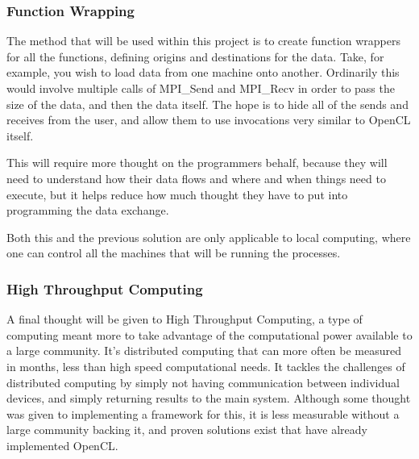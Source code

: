 \documentclass[../thesis.tex]{subfiles}
\begin{document}
        \subsubsection{Function Wrapping} %
        \label{ssub:function_wrapping}
            The method that will be used within this project is to create function wrappers for all the functions, defining origins and destinations for the data. Take, for example, you wish to load data from one machine onto another. Ordinarily this would involve multiple calls of MPI\_Send and MPI\_Recv in order to pass the size of the data, and then the data itself. The hope is to hide all of the sends and receives from the user, and allow them to use invocations very similar to OpenCL itself.

            This will require more thought on the programmers behalf, because they will need to understand how their data flows and where and when things need to execute, but it helps reduce how much thought they have to put into programming the data exchange.

            Both this and the previous solution are only applicable to local computing, where one can control all the machines that will be running the processes.
        \subsubsection{High Throughput Computing} %
        \label{ssub:high_throughput_computing}
            A final thought will be given to High Throughput Computing, a type of computing meant more to take advantage of the computational power available to a large community. It's distributed computing that can more often be measured in months, less than high speed computational needs. It tackles the challenges of distributed computing by simply not having communication between individual devices, and simply returning results to the main system. Although some thought was given to implementing a framework for this, it is less measurable without a large community backing it, and proven solutions exist that have already implemented OpenCL\cite{boinc}. 
\end{document}
